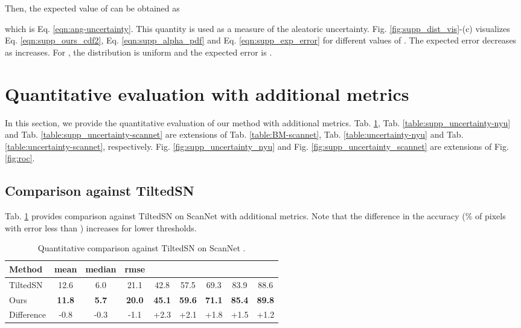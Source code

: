 \documentclass[10pt,twocolumn,letterpaper]{article}
\begin{document}
\noindent
Then, the expected value of  can be obtained as



\noindent
which is Eq. \ref{eqn:ang-uncertainty}. This quantity is used as a measure of the aleatoric uncertainty. Fig. \ref{fig:supp_dist_vis}-(c) visualizes Eq. \ref{eqn:supp_ours_cdf2}, Eq. \ref{eqn:supp_alpha_pdf} and Eq. \ref{eqn:supp_exp_error} for different values of . The expected error decreases as  increases. For , the distribution is uniform and the expected error is .

\section{Quantitative evaluation with additional metrics}
\label{sec:quantitative}

In this section, we provide the quantitative evaluation of our method with additional metrics. Tab. \ref{table:supp_tiltedsn_comparison}, Tab. \ref{table:supp_uncertainty-nyu} and Tab. \ref{table:supp_uncertainty-scannet} are extensions of Tab. \ref{table:BM-scannet}, Tab. \ref{table:uncertainty-nyu} and Tab. \ref{table:uncertainty-scannet}, respectively. Fig. \ref{fig:supp_uncertainty_nyu} and Fig. \ref{fig:supp_uncertainty_scannet} are extensions of Fig. \ref{fig:roc}.

\subsection{Comparison against TiltedSN}

Tab. \ref{table:supp_tiltedsn_comparison} provides comparison against TiltedSN \cite{SNfromRGB_20_TiltedSN} on ScanNet \cite{ScanNet} with additional metrics. Note that the difference in the accuracy (\% of pixels with error less than ) increases for lower thresholds. 

\begin{table}[h]
\normalsize
\begin{center}
\begin{tabular}{l|ccc|ccccc}
\toprule
Method & mean & median & rmse &  &  &  &  &  \\
\midrule
TiltedSN\cite{SNfromRGB_20_TiltedSN} 
& 12.6 & 6.0 & 21.1 
& 42.8 & 57.5 & 69.3 & 83.9 & 88.6 \\
Ours 
& \textbf{11.8} & \textbf{5.7} & \textbf{20.0} 
& \textbf{45.1} & \textbf{59.6} & \textbf{71.1} & \textbf{85.4} & \textbf{89.8} \\
\hline
Difference
& -0.8 & -0.3 & -1.1
& +2.3 & +2.1 & +1.8 & +1.5 & +1.2 \\
\bottomrule
\end{tabular}
\end{center}
\caption{Quantitative comparison against TiltedSN \cite{SNfromRGB_20_TiltedSN} on ScanNet \cite{ScanNet}.}
\label{table:supp_tiltedsn_comparison}
\end{table}
\end{document}
